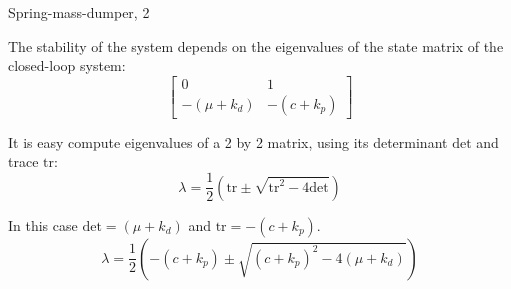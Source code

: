 \documentclass{beamer}
\begin{document}
\begin{frame}{Spring-mass-dumper, 2}
	\begin{flushleft}
		
		The stability of the system depends on the eigenvalues of the state matrix of the closed-loop system:
		\begin{equation}
			\begin{bmatrix}
				0 & 1 \\ -(\mu + k_d) & -(c+k_p)
			\end{bmatrix}
		\end{equation}
		
		It is easy compute eigenvalues of a 2 by 2 matrix, using its determinant $\text{det}$ and trace $\text{tr}$:
		\begin{equation}
			\lambda = \frac{1}{2} \left( \text{tr} \pm \sqrt{\text{tr}^2 - 4 \text{det}} \right)
		\end{equation}
		
		In this case $\text{det} = (\mu + k_d)$ and $\text{tr} = - (c+k_p)$.
		\begin{equation}
			\lambda = \frac{1}{2} \left( - (c+k_p) \pm \sqrt{(c+k_p)^2 - 4 (\mu + k_d)} \right)
		\end{equation}
		
		
	\end{flushleft}
\end{frame}
\end{document}
